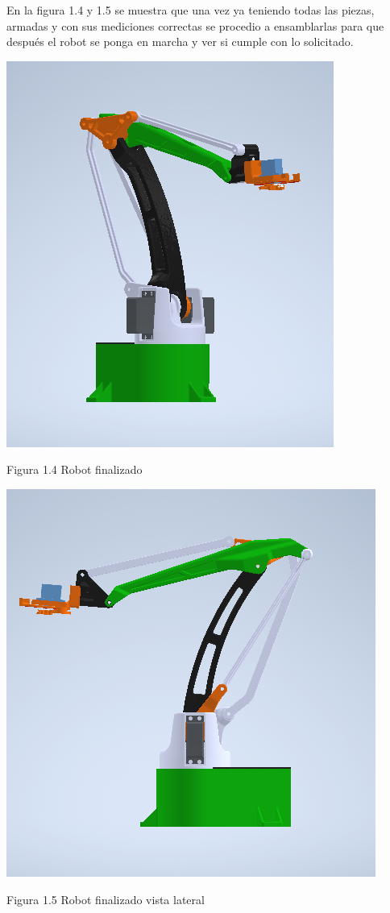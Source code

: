 \documentclass[12pt,letterpaper]{article}
\begin{document}
\newpage

\begin{flushleft}
En la figura 1.4 y 1.5 se muestra que una vez ya teniendo todas las piezas, armadas y con sus mediciones correctas se procedio a ensamblarlas para que después el robot se ponga en marcha y ver si cumple con lo solicitado.
\end{flushleft}
\begin{center}
\includegraphics[scale=0.7]{ensamblaje1.PNG}
\end{center} 
\begin{center}
Figura 1.4 Robot finalizado
\end{center}
\begin{center}
\includegraphics[scale=0.7]{ensamblaje2.PNG}
\end{center} 
\begin{center}
Figura 1.5 Robot finalizado vista lateral
\end{center}
\end{document}
